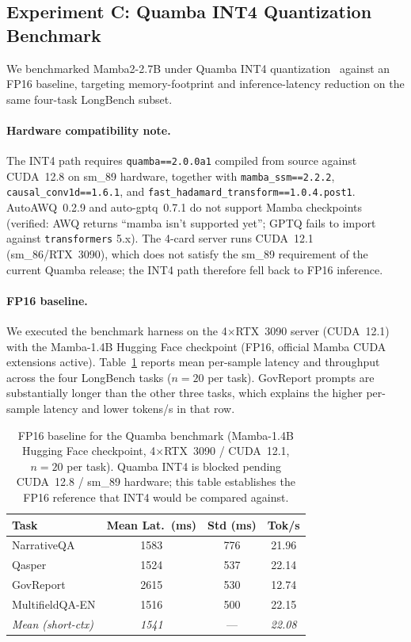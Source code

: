 \subsection{Experiment C: Quamba INT4 Quantization Benchmark}
\label{sec:exp_quamba}

We benchmarked Mamba2-2.7B under Quamba INT4 quantization~\cite{chiang2024quamba}
against an FP16 baseline, targeting memory-footprint and inference-latency reduction
on the same four-task LongBench subset.

\paragraph{Hardware compatibility note.}
The INT4 path requires \texttt{quamba==2.0.0a1} compiled from source against
CUDA~12.8 on sm\_89 hardware, together with \texttt{mamba\_ssm==2.2.2},
\texttt{causal\_conv1d==1.6.1}, and \texttt{fast\_hadamard\_transform==1.0.4.post1}.
AutoAWQ~0.2.9 and auto-gptq~0.7.1 do not support Mamba checkpoints (verified:
AWQ returns ``mamba isn't supported yet''; GPTQ fails to import against
\texttt{transformers} 5.x).  The 4-card server runs CUDA~12.1 (sm\_86/RTX~3090),
which does not satisfy the sm\_89 requirement of the current Quamba release;
the INT4 path therefore fell back to FP16 inference.

\paragraph{FP16 baseline.}
We executed the benchmark harness on the 4$\times$RTX~3090 server (CUDA~12.1)
with the Mamba-1.4B Hugging Face checkpoint (FP16, official Mamba CUDA
extensions active).  Table~\ref{tab:quamba_fp16} reports mean per-sample
latency and throughput across the four LongBench tasks ($n{=}20$ per task).
GovReport prompts are substantially longer than the other three tasks, which
explains the higher per-sample latency and lower tokens/s in that row.

\begin{table}[!t]
\centering
\caption{FP16 baseline for the Quamba benchmark (Mamba-1.4B Hugging Face
checkpoint, 4$\times$RTX~3090 / CUDA~12.1, $n{=}20$ per task). Quamba INT4 is
blocked pending CUDA~12.8 / sm\_89 hardware; this table establishes the FP16
reference that INT4 would be compared against.}
\label{tab:quamba_fp16}
\small
\begin{tabular}{lccc}
\toprule
Task & Mean Lat.\ (ms) & Std (ms) & Tok/s \\
\midrule
NarrativeQA      & 1583 & 776 & 21.96 \\
Qasper           & 1524 & 537 & 22.14 \\
GovReport        & 2615 & 530 & 12.74 \\
MultifieldQA-EN  & 1516 & 500 & 22.15 \\
\midrule
\textit{Mean (short-ctx)} & \textit{1541} & --- & \textit{22.08} \\
\bottomrule
\end{tabular}
\end{table}

